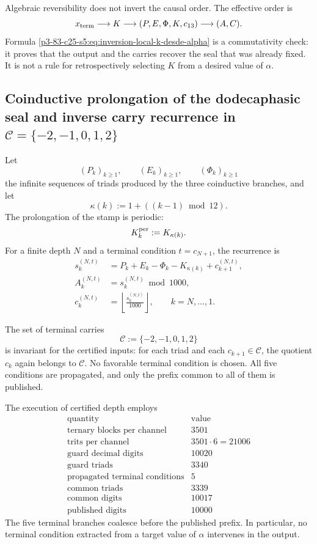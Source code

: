 Algebraic reversibility does not invert the causal order. The effective order
is
\[
 x_{\rm term}
 \longrightarrow K
 \longrightarrow(P,E,\Phi,K,c_{13})
 \longrightarrow(A,C).
\]
Formula \eqref{p3-83-c25-s5:eq:inversion-local-k-desde-alpha} is a commutativity
check: it proves that the output and the carries recover the seal
that was already fixed. It is not a rule for retrospectively selecting
\(K\) from a desired value of \(\alpha\).

\subsection{Coinductive prolongation of the dodecaphasic seal and inverse carry recurrence in \(\mathcal C=\{-2,-1,0,1,2\}\)}

Let
\[
 (P_k)_{k\geq1},
 \qquad
 (E_k)_{k\geq1},
 \qquad
 (\Phi_k)_{k\geq1}
\]
the infinite sequences of triads produced by the three coinductive branches, and let
\[
 \kappa(k):=1+((k-1)\bmod12).
\]
The prolongation of the stamp is periodic:
\[
 K_k^{\rm per}:=K_{\kappa(k)}.
\]
For a finite depth \(N\) and a terminal condition
\(t=c_{N+1}\), the recurrence is
\begin{equation}
\begin{aligned}
 s_k^{(N,t)}
 &=P_k+E_k-\Phi_k-K_{\kappa(k)}+c_{k+1}^{(N,t)},\\
 A_k^{(N,t)}
 &=s_k^{(N,t)}\bmod1000,\\
 c_k^{(N,t)}
 &=\left\lfloor\frac{s_k^{(N,t)}}{1000}\right\rfloor,
 \qquad k=N,\ldots,1.
\end{aligned}
\label{p3-83-c25-s5:eq:recurrencia-larga-alpha}
\end{equation}

The set of terminal carries
\[
 \mathcal C:=\{-2,-1,0,1,2\}
\]
is invariant for the certified inputs: for each triad and each
\(c_{k+1}\in\mathcal C\), the quotient \(c_k\) again belongs to
\(\mathcal C\). No favorable terminal condition is chosen. All
five conditions are propagated, and only the prefix common to all of them is published.

The execution of certified depth employs
\[
\begin{array}{c|r}
\text{quantity}&\text{value}\\ \hline
\text{ternary blocks per channel}&3501\\
\text{trits per channel}&3501\cdot6=21006\\
\text{guard decimal digits}&10020\\
\text{guard triads}&3340\\
\text{propagated terminal conditions}&5\\
\text{common triads}&3339\\
\text{common digits}&10017\\
\text{published digits}&10000
\end{array}
\]
The five terminal branches coalesce before the published prefix. In
particular, no terminal condition extracted from a target value of
\(\alpha\) intervenes in the output.

